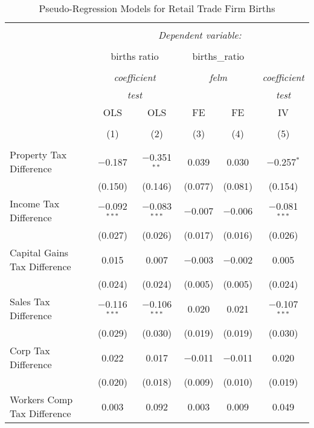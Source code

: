 
\begin{table}[!htbp] \centering 
  \caption{Pseudo-Regression Models for  Retail Trade Firm Births} 
  \label{} 
\begin{tabular}{@{\extracolsep{5pt}}lccccc} 
\\[-1.8ex]\hline 
\hline \\[-1.8ex] 
 & \multicolumn{5}{c}{\textit{Dependent variable:}} \\ 
\cline{2-6} 
\\[-1.8ex] & \multicolumn{2}{c}{births ratio} & \multicolumn{2}{c}{births\_ratio} &   \\ 
\\[-1.8ex] & \multicolumn{2}{c}{\textit{coefficient}} & \multicolumn{2}{c}{\textit{felm}} & \textit{coefficient} \\ 
 & \multicolumn{2}{c}{\textit{test}} & \multicolumn{2}{c}{\textit{}} & \textit{test} \\ 
 & OLS & OLS & FE & FE & IV \\ 
\\[-1.8ex] & (1) & (2) & (3) & (4) & (5)\\ 
\hline \\[-1.8ex] 
 Property Tax Difference & $-$0.187 & $-$0.351$^{**}$ & 0.039 & 0.030 & $-$0.257$^{*}$ \\ 
  & (0.150) & (0.146) & (0.077) & (0.081) & (0.154) \\ 
  Income Tax Difference & $-$0.092$^{***}$ & $-$0.083$^{***}$ & $-$0.007 & $-$0.006 & $-$0.081$^{***}$ \\ 
  & (0.027) & (0.026) & (0.017) & (0.016) & (0.026) \\ 
  Capital Gains Tax Difference & 0.015 & 0.007 & $-$0.003 & $-$0.002 & 0.005 \\ 
  & (0.024) & (0.024) & (0.005) & (0.005) & (0.024) \\ 
  Sales Tax Difference & $-$0.116$^{***}$ & $-$0.106$^{***}$ & 0.020 & 0.021 & $-$0.107$^{***}$ \\ 
  & (0.029) & (0.030) & (0.019) & (0.019) & (0.030) \\ 
  Corp Tax Difference & 0.022 & 0.017 & $-$0.011 & $-$0.011 & 0.020 \\ 
  & (0.020) & (0.018) & (0.009) & (0.010) & (0.019) \\ 
  Workers Comp Tax Difference & 0.003 & 0.092 & 0.003 & 0.009 & 0.049 \\ 

\end{tabular}
\end{table}
